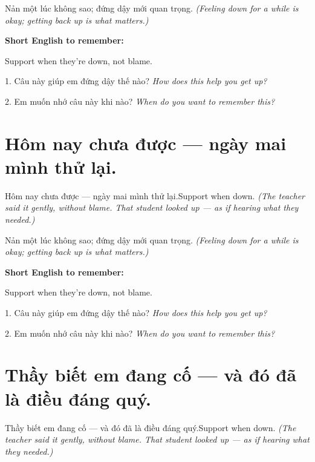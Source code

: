 \begin{baihoc}
Nản một lúc không sao; đứng dậy mới quan trọng.
\textit{(Feeling down for a while is okay; getting back up is what matters.)}
\end{baihoc}

\begin{ghinhoanh}
\textbf{Short English to remember:}

Support when they're down, not blame.

\end{ghinhoanh}

\begin{tuhocnhanh}
1. Câu này giúp em đứng dậy thế nào? \textit{How does this help you get up?}

2. Em muốn nhớ câu này khi nào? \textit{When do you want to remember this?}
\end{tuhocnhanh}
\ngancach


\section{Hôm nay chưa được — ngày mai mình thử lại.}
\begin{truyen}{Hôm nay chưa được — ngày mai mình thử lại.}{Support when down.}
\textit{(The teacher said it gently, without blame. That student looked up — as if hearing what they needed.)}
\end{truyen}

\begin{baihoc}
Nản một lúc không sao; đứng dậy mới quan trọng.
\textit{(Feeling down for a while is okay; getting back up is what matters.)}
\end{baihoc}

\begin{ghinhoanh}
\textbf{Short English to remember:}

Support when they're down, not blame.

\end{ghinhoanh}

\begin{tuhocnhanh}
1. Câu này giúp em đứng dậy thế nào? \textit{How does this help you get up?}

2. Em muốn nhớ câu này khi nào? \textit{When do you want to remember this?}
\end{tuhocnhanh}
\ngancach


\section{Thầy biết em đang cố — và đó đã là điều đáng quý.}
\begin{truyen}{Thầy biết em đang cố — và đó đã là điều đáng quý.}{Support when down.}
\textit{(The teacher said it gently, without blame. That student looked up — as if hearing what they needed.)}
\end{truyen}

